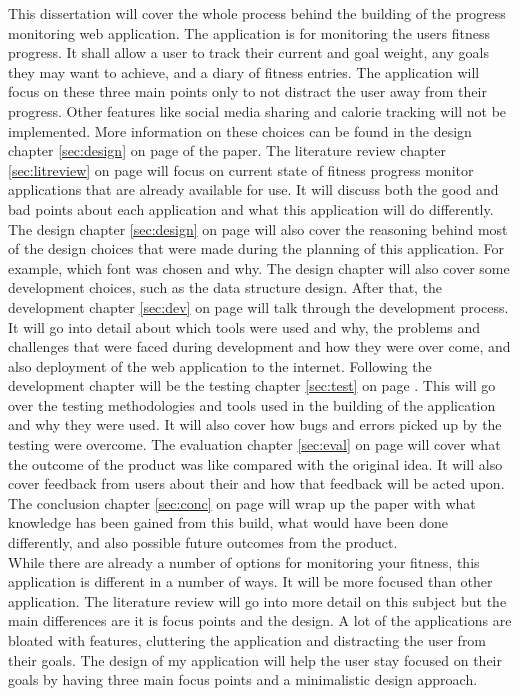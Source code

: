 This dissertation will cover the whole process behind the building of the progress monitoring web application. The application is for monitoring the users fitness progress. It shall allow a user to track their current and goal weight, any goals they may want to achieve, and a diary of fitness entries. The application will focus on these three main points only to not distract the user away from their progress. Other features like social media sharing and calorie tracking will not be implemented. More information on these choices can be found in the design chapter \ref{sec:design} on page \pageref{sec:design} of the paper. The literature review chapter \ref{sec:litreview} on page \pageref{sec:litreview} will focus on current state of fitness progress monitor applications that are already available for use. It will discuss both the good and bad points about each application and what this application will do differently. The design chapter \ref{sec:design} on page \pageref{sec:design} will also cover the reasoning behind most of the design choices that were made during the planning of this application. For example, which font was chosen and why. The design chapter will also cover some development choices, such as the data structure design. After that, the development chapter \ref{sec:dev} on page \pageref{sec:dev} will talk through the development process. It will go into detail about which tools were used and why, the problems and challenges that were faced during development and how they were over come, and also deployment of the web application to the internet. Following the development chapter will be the testing chapter \ref{sec:test} on page \pageref{sec:test}. This will go over the testing methodologies and tools used in the building of the application and why they were used. It will also cover how bugs and errors picked up by the testing were overcome. The evaluation chapter \ref{sec:eval} on page \pageref{sec:eval} will cover what the outcome of the product was like compared with the original idea. It will also cover feedback from users about their and how that feedback will be acted upon. The conclusion chapter \ref{sec:conc} on page \pageref{sec:conc} will wrap up the paper with what knowledge has been gained from this build, what would have been done differently, and also possible future outcomes from the product.\\

While there are already a number of options for monitoring your fitness, this application is different in a number of ways. It will be more focused than other application. The literature review will go into more detail on this subject but the main differences are it is focus points and the design. A lot of the applications are bloated with features, cluttering the application and distracting the user from their goals. The design of my application will help the user stay focused on their goals by having three main focus points and a minimalistic design approach.\\
